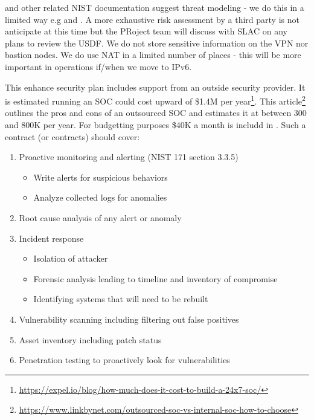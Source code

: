  and other related NIST documentation suggest threat modeling - we do this in a limited way e.g  and . A more exhaustive risk assessment by a third party is not anticipate at this time but the PRoject team will discuss with SLAC on any plans to review the USDF.
We do not store sensitive information on the VPN nor bastion nodes.
We do use NAT in a limited number of places - this will be more important in operations if/when we move to IPv6.







This enhance security plan includes support from an outside security provider.
It is estimated running an SOC could cost upward of \$1.4M per year\footnote{\url{https://expel.io/blog/how-much-does-it-cost-to-build-a-24x7-soc/}}.
This article\footnote{\url{https://www.linkbynet.com/outsourced-soc-vs-internal-soc-how-to-choose}} outlines the pros and cons of
an outsourced SOC and estimates it at between 300 and 800K per year.
For budgetting purposes  \$40K a month is includd in .
Such a contract (or contracts) should cover:

\begin{enumerate}
\item Proactive monitoring and alerting (NIST 171 section 3.3.5)
  \begin{itemize}
  \item Write alerts for suspicious behaviors
  \item Analyze collected logs for anomalies
  \end{itemize}
\item Root cause analysis of any alert or anomaly
\item Incident response
  \begin{itemize}
  \item Isolation of attacker
  \item Forensic analysis leading to timeline and inventory of compromise
  \item Identifying systems that will need to be rebuilt
  \end{itemize}
\item Vulnerability scanning including filtering out false positives
\item Asset inventory including patch status
\item Penetration testing to proactively look for vulnerabilities
\end{enumerate}

